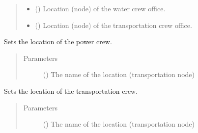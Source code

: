 \documentclass[letterpaper,10pt,english]{sphinxmanual}
\begin{document}
\begin{fulllineitems}
\begin{fulllineitems}
\begin{quote}
\begin{description}
\begin{itemize}
\item {} 
\sphinxAtStartPar
{} () \textendash{} Location (node) of the water crew office.

\item {} 
\sphinxAtStartPar
{} () \textendash{} Location (node) of the transportation crew office.

\end{itemize}

\end{description}\end{quote}

\end{fulllineitems}


\begin{fulllineitems}
\label{\detokenize{apidoc:dreaminsg_integrated_model.src.network_sim_models.integrated_network.IntegratedNetwork.set_power_crew_loc}}
\sphinxAtStartPar
Sets the location of the power crew.
\begin{quote}\begin{description}
\item[{Parameters}] \leavevmode
\sphinxAtStartPar
{} () \textendash{} The name of the location (transportation  node)

\end{description}\end{quote}

\end{fulllineitems}


\begin{fulllineitems}
\label{\detokenize{apidoc:dreaminsg_integrated_model.src.network_sim_models.integrated_network.IntegratedNetwork.set_transpo_crew_loc}}
\sphinxAtStartPar
Sets the location of the transportation crew.
\begin{quote}\begin{description}
\item[{Parameters}] \leavevmode
\sphinxAtStartPar
{} () \textendash{} The name of the location (transportation  node)


\end{description}
\end{quote}
\end{fulllineitems}
\end{fulllineitems}
\end{document}
